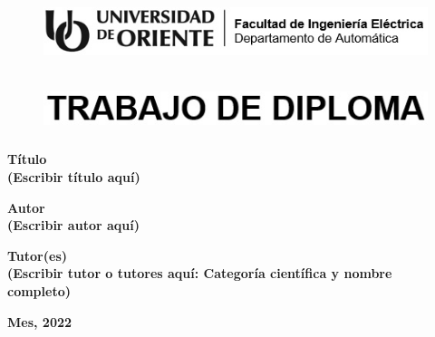 \thispagestyle{empty}

\begin{figure}[h]
    \centering
    \includegraphics[width=15cm, height=2cm]{imagenes/identidad en blanco y negro.jpg}
\end{figure}

\vspace{1cm}

\begin{figure}[h]
    \centering
    \includegraphics[width=14cm, height=1.5cm]{imagenes/trabajo de diploma}
\end{figure}

\vspace{1cm}

\begin{center}
    \textbf{\large
        Título\\
        (Escribir título aquí)}
    \vspace{0.5cm}

    \textbf{\large Autor\\
    (Escribir autor aquí)}
    \vspace{0.5cm}

    \textbf{\large Tutor(es)\\
    (Escribir tutor o tutores aquí: Categoría científica y nombre\\
    completo)}

    \vfill

    \textbf{\large Mes, 2022}

\end{center}